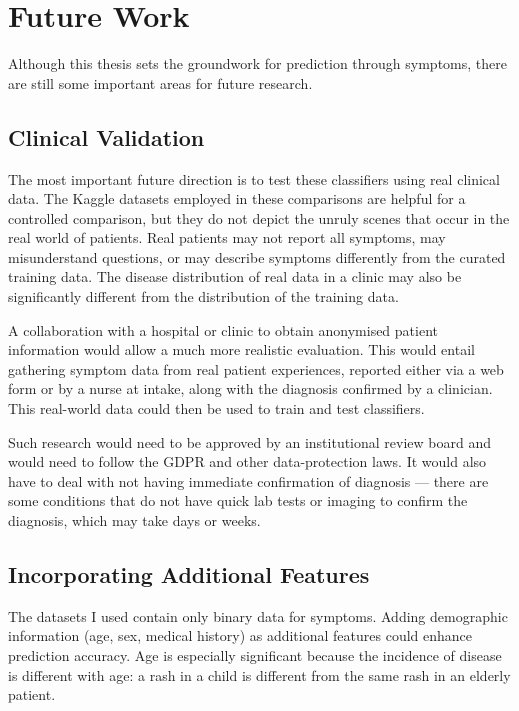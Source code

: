 \section{Future Work}
\label{sec:future_work}

Although this thesis sets the groundwork for prediction through symptoms, there are still some important areas for future research.

\subsection{Clinical Validation}

The most important future direction is to test these classifiers using real clinical data. The Kaggle datasets employed in these comparisons are helpful for a controlled comparison, but they do not depict the unruly scenes that occur in the real world of patients. Real patients may not report all symptoms, may misunderstand questions, or may describe symptoms differently from the curated training data. The disease distribution of real data in a clinic may also be significantly different from the distribution of the training data.

A collaboration with a hospital or clinic to obtain anonymised patient information would allow a much more realistic evaluation. This would entail gathering symptom data from real patient experiences, reported either via a web form or by a nurse at intake, along with the diagnosis confirmed by a clinician. This real-world data could then be used to train and test classifiers.

Such research would need to be approved by an institutional review board and would need to follow the GDPR and other data-protection laws. It would also have to deal with not having immediate confirmation of diagnosis --- there are some conditions that do not have quick lab tests or imaging to confirm the diagnosis, which may take days or weeks.

\subsection{Incorporating Additional Features}

The datasets I used contain only binary data for symptoms. Adding demographic information (age, sex, medical history) as additional features could enhance prediction accuracy. Age is especially significant because the incidence of disease is different with age: a rash in a child is different from the same rash in an elderly patient.

